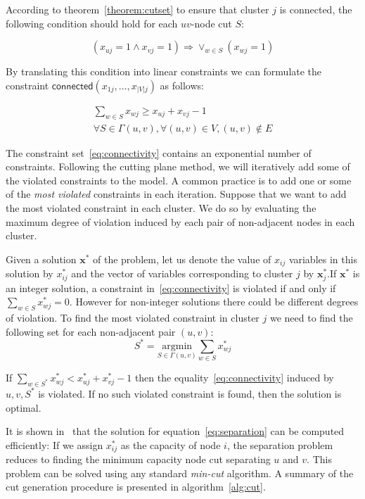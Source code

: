 \documentclass[conference]{IEEEtran}
\begin{document}
According to theorem~\ref{theorem:cutset} to ensure that cluster $j$ is connected, the following condition should hold for each $uv$-node cut $S$:

\begin{equation*}
(x_{uj}=1 \land x_{vj}=1) \Rightarrow \lor_{w \in S} (x_{wj}=1)
\end{equation*}

By translating this condition into linear constraints we can formulate the constraint $\mathsf{connected}(x_{1j}, \ldots, x_{|V|j})$ as follows:

\begin{multline}
\sum_{w \in S} x_{wj} \geq x_{uj} + x_{vj} - 1 \\
\forall S \in \Gamma(u, v), \forall (u, v) \in V, (u, v) \notin E
\label{eq:connectivity}
\end{multline}

The constraint set~\ref{eq:connectivity} contains an exponential number of constraints. Following the cutting plane method, we will iteratively add some of the violated constraints to the model. A common practice is to add one or some of the \emph{most violated} constraints in each iteration. Suppose that we want to add the most violated constraint in each cluster. We do so by evaluating the maximum degree of violation induced by each pair of non-adjacent nodes in each cluster. 

Given a solution $\mathbf{x}^*$ of the problem, let us denote the value of $x_{ij}$ variables in this solution by $x^*_{ij}$ and the vector of variables corresponding to cluster $j$ by $\mathbf{x}^*_j$.If $\mathbf{x}^*$ is an integer solution, a constraint in~\ref{eq:connectivity} is violated if and only if $\sum_{w \in S} x^*_{wj} = 0$. However for non-integer solutions there could be different degrees of violation. To find the most violated constraint in cluster $j$ we need to find the following set for each non-adjacent pair $(u, v)$:
\begin{equation}
S^* =\underset{S \in \Gamma(u, v)}{\mathrm{argmin}} \sum_{w \in S} x^*_{wj}
\label{eq:separation}
\end{equation}

If $\sum_{w \in S^*} x_{wj}^* < x^*_{uj} + x^*_{vj} - 1$ then the equality~\ref{eq:connectivity} induced by $u, v, S^*$ is violated. If no such violated constraint is found, then the solution is optimal.


 
It is shown in~\cite{CarvajalCGVW13} that the solution for equation~\ref{eq:separation} can be computed efficiently: If we assign $x^*_{ij}$ as the capacity of node $i$, the separation problem reduces to finding the minimum capacity node cut separating $u$ and $v$. This problem can be solved using any standard \emph{min-cut} algorithm. A summary of the cut generation procedure is presented in algorithm~\ref{alg:cut}. 
\end{document}
